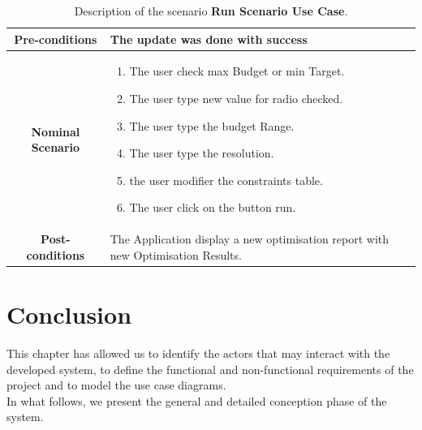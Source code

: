 		\begin{table}
		\caption{Description of the scenario \textbf{Run Scenario Use Case}.}
		\label{DSTabRS}
		\centering
		\begin{tabular}{|c|p{10cm}|}
			\hline 	
			\textbf{Pre-conditions } & The update was done with success \\ 
			\hline                     
			\textbf{Nominal Scenario } & \begin{enumerate}
				\item The user check max Budget or min Target.
				\item The user type new value for radio checked.
				\item The user type the budget Range.
				\item The user type the resolution.
				\item the user modifier the constraints table.
				\item The user click on the button run. 
			\end{enumerate} \\ 
			\hline 
			\textbf{Post-conditions} & The Application display a new optimisation report with new Optimisation Results. \\
			\hline 
		\end{tabular}
	\end{table}
	
	\section{Conclusion}
	This chapter has allowed us to identify the actors that may interact with the developed system, to define the functional and non-functional requirements of the project and to model the use case diagrams.
	\\
	In what follows, we present the general and detailed conception phase of the system.  
	
